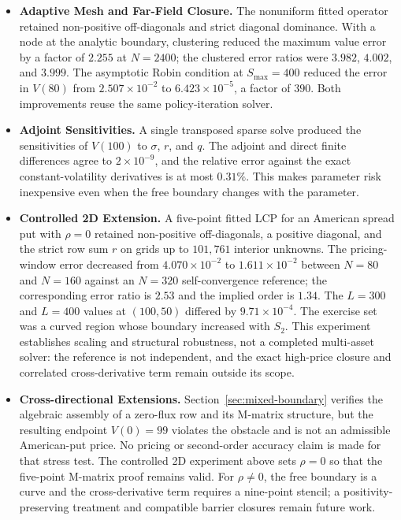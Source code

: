 \documentclass[11pt,a4paper]{article}
\theoremstyle{definition}
\theoremstyle{remark}
\begin{document}
\begin{itemize}[leftmargin=2em]
\item \textbf{Adaptive Mesh and Far-Field Closure.} The nonuniform fitted operator retained non-positive off-diagonals and strict diagonal dominance. With a node at the analytic boundary, clustering reduced the maximum value error by a factor of \(2.255\) at \(N=2400\); the clustered error ratios were \(3.982\), \(4.002\), and \(3.999\). The asymptotic Robin condition at \(S_{\max}=400\) reduced the error in \(V(80)\) from \(2.507\times10^{-2}\) to \(6.423\times10^{-5}\), a factor of \(390\). Both improvements reuse the same policy-iteration solver.

\item \textbf{Adjoint Sensitivities.} A single transposed sparse solve produced the sensitivities of \(V(100)\) to \(\sigma\), \(r\), and \(q\). The adjoint and direct finite differences agree to \(2\times10^{-9}\), and the relative error against the exact constant-volatility derivatives is at most \(0.31\%\). This makes parameter risk inexpensive even when the free boundary changes with the parameter.

\item \textbf{Controlled 2D Extension.} A five-point fitted LCP for an American spread put with \(\rho=0\) retained non-positive off-diagonals, a positive diagonal, and the strict row sum \(r\) on grids up to \(101{,}761\) interior unknowns. The pricing-window error decreased from \(4.070\times10^{-2}\) to \(1.611\times10^{-2}\) between \(N=80\) and \(N=160\) against an \(N=320\) self-convergence reference; the corresponding error ratio is \(2.53\) and the implied order is \(1.34\). The \(L=300\) and \(L=400\) values at \((100,50)\) differed by \(9.71\times10^{-4}\). The exercise set was a curved region whose boundary increased with \(S_2\). This experiment establishes scaling and structural robustness, not a completed multi-asset solver: the reference is not independent, and the exact high-price closure and correlated cross-derivative term remain outside its scope.

\item \textbf{Cross-directional Extensions.} Section~\ref{sec:mixed-boundary} verifies the algebraic assembly of a zero-flux row and its M-matrix structure, but the resulting endpoint \(V(0)=99\) violates the obstacle and is not an admissible American-put price. No pricing or second-order accuracy claim is made for that stress test. The controlled 2D experiment above sets \(\rho=0\) so that the five-point M-matrix proof remains valid. For \(\rho\ne0\), the free boundary is a curve and the cross-derivative term requires a nine-point stencil; a positivity-preserving treatment and compatible barrier closures remain future work.
\end{itemize}
\end{document}
